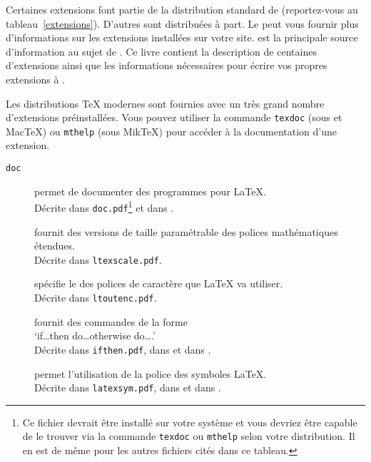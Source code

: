 Certaines extensions font partie de la distribution
standard de \LaTeXe{} (reportez-vous au
tableau~\ref{extensions}). D'autres sont distribuées à part. Le
\guide{} peut vous fournir plus d'informations sur les extensions
installées sur votre site. \companion{} est la principale source
d'information au sujet de \LaTeXe{}. Ce livre contient la description
de centaines d'extensions ainsi que les informations nécessaires pour
écrire vos propres extensions à \LaTeXe.

Les distributions \TeX{} modernes sont fournies avec un très grand
nombre d'extensions préinstallées. Vous pouvez utiliser la commande
\texttt{texdoc} (sous \texlive et Mac\TeX) ou \texttt{mthelp} (sous Mik\TeX{})
pour accéder à la documentation d'une extension.


\begin{table}[!tbp]
\caption{Quelques extensions fournies avec \LaTeX} \label{extensions}
\begin{lined}{\textwidth}
\begin{description}
\item[\normalfont\texttt{doc}] permet de documenter des programmes
 pour  \LaTeX{}.\\
 Décrite dans \texttt{doc.pdf}\footnote{Ce fichier devrait être installé
 sur votre système et vous devriez être capable de le trouver via
 la commande \texttt{texdoc} ou \texttt{mthelp} selon votre distribution. Il en est de même pour les autres
 fichiers cités dans ce tableau.} et dans \companion.

\item[\normalfont{}] fournit des versions de taille
  paramétrable des polices mathématiques étendues.\\
  Décrite dans \texttt{ltexscale.pdf}.

\item[\normalfont{}] spécifie le  des polices
  de caractère que \LaTeX{} va utiliser.\\
  Décrite dans \texttt{ltoutenc.pdf}.

\item[\normalfont{}] fournit des commandes de la forme\\
  `if\dots then do\dots otherwise do\dots.'\\
  Décrite dans \texttt{ifthen.pdf}, dans \companion{} et dans
  \desgraupes{}.

\item[\normalfont{}] permet l'utilisation de la police des
  symboles \LaTeX{}.\\
  Décrite dans \texttt{latexsym.pdf}, dans \companion{} et dans
  \desgraupes{}.


\end{description}
\end{lined}
\end{table}
